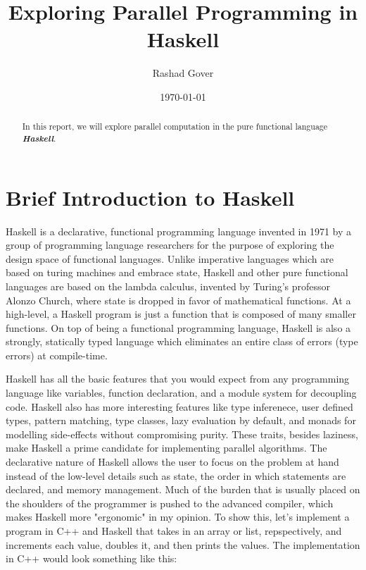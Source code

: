 \documentclass[a4paper, 10pt]{article}
\author{Rashad Gover}
\date{\today}
\title{Exploring Parallel Programming in Haskell}
\begin{document}
\maketitle

\newpage
\tableofcontents

\newpage

\begin{abstract}
  In this report, we will explore parallel computation in the pure functional language \textbf{\textit{Haskell}}.
\end{abstract}

\section{Brief Introduction to Haskell}
Haskell is a declarative, functional programming language invented in 1971 by a group of programming language researchers for the purpose of exploring the design space of functional languages. Unlike imperative languages which are based on turing machines and embrace state, Haskell and other pure functional languages are based on the lambda calculus, invented by Turing's professor Alonzo Church, where state is dropped in favor of mathematical functions. At a high-level, a Haskell program is just a function that is composed of many smaller functions. On top of being a functional programming language, Haskell is also a strongly, statically typed language which eliminates an entire class of errors (type errors) at compile-time. 

Haskell has all the basic features that you would expect from any programming language like variables, function declaration,  and a module system for decoupling code. Haskell also has more interesting features like type inferenece, user defined types, pattern matching, type classes, lazy evaluation by default, and monads for modelling side-effects without compromising purity. These traits, besides laziness, make Haskell a prime candidate for implementing parallel algorithms. The declarative nature of Haskell allows the user to focus on the problem at hand instead of the low-level details such as state, the order in which statements are declared, and memory management.  Much of the burden that is usually placed on the shoulders of the programmer is pushed to the advanced compiler, which makes Haskell more "ergonomic" in my opinion. To show this, let's implement a program in C++ and Haskell that takes in an array or list, repspectively, and increments each value, doubles it, and then prints the values. The implementation in C++ would look something like this:
\end{document}
